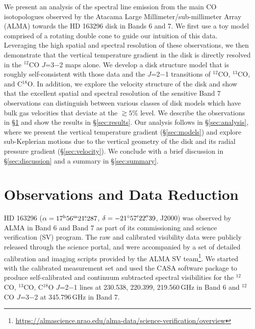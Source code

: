We present an analysis of the spectral line emission from the main CO 
isotopologues observed by the Atacama Large Millimeter/sub-millimeter Array 
(ALMA) towards the HD 163296 disk in Bands 6 and 7.  We first use a toy model 
comprised of a rotating double cone to guide our intuition of this data. 
Leveraging the high spatial and spectral resolution of these observations, we 
then demonstrate that the vertical temperature gradient in the disk is directly 
resolved in the $^{12}$CO $J$=3$-$2 maps alone.  We develop a disk structure 
model that is roughly self-consistent with those data and the $J$=2$-$1 
transitions of $^{12}$CO, $^{13}$CO, and C$^{18}$O.  In addition, we explore the
velocity structure of the disk and show that the excellent spatial and spectral 
resolution of the sensitive Band 7 observations can distinguish between various 
classes of disk models which have bulk gas velocities that deviate at the 
$\gtrsim 5$\% level.  We describe the observations in \S\ref{sec:observations} 
and show the results in \S\ref{sec:results}.  Our analysis follows in 
\S\ref{sec:analysis}, where we present the vertical temperature gradient 
(\S\ref{sec:models}) and explore sub-Keplerian motions due to the vertical 
geometry of the disk and its radial pressure gradient (\S\ref{sec:velocity}).  
We conclude with a brief discussion in \S\ref{sec:discussion} and a summary in 
\S\ref{sec:summary}.


\section{Observations and Data Reduction}\label{sec:observations}

HD 163296 ($\alpha = 17^{\rm h} 56^{\rm m} 21\mbox{$.\!\!^{\mathrm s}$}287$, 
$\delta = -21\mbox{$^\circ$}57\mbox{$^\prime$}22\mbox{$.\!\!^{\prime\prime}$}39$, J2000) was observed by ALMA in Band 6 
and Band 7 as part of its commissioning and science verification (SV) program. 
The raw and calibrated visibility data were publicly released through the 
science portal, and were accompanied by a set of detailed calibration and 
imaging scripts provided by the ALMA SV team\footnote{\url{https://almascience.nrao.edu/alma-data/science-verification/overview}}.  
We started with the calibrated measurement set and used the CASA software 
package \citep[v3.4;][]{mcmullin07} to produce self-calibrated and continuum 
subtracted spectral visibilities for the $^{12}$CO, $^{13}$CO, C$^{18}$O 
$J$=2$-$1 lines at 230.538, 220.399, 219.560\,GHz in Band 6 and $^{12}$CO 
$J$=3$-$2 at 345.796\,GHz in Band 7.

